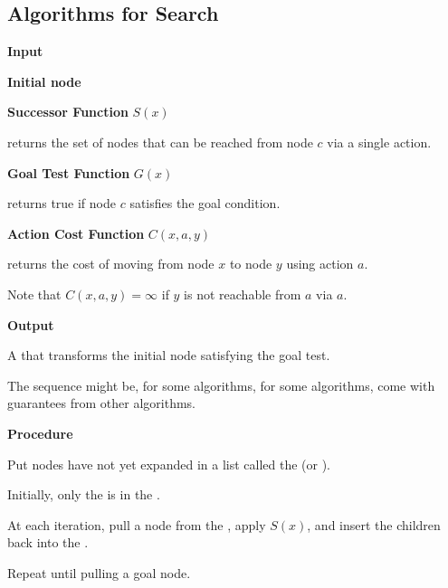 \subsection{Algorithms for Search}

\begin{listu}
    \item \textbf{Input}
    
    \begin{listu}
        \item \textbf{Initial node}

        \item \textbf{Successor Function} $S(x)$
        
        returns the set of nodes that can be reached from node $c$ via a single action. 

        \item \textbf{Goal Test Function} $G(x)$
        
        returns true if node $c$ satisfies the goal condition. 

        \item \textbf{Action Cost Function} $C(x, a, y)$
        
        returns the cost of moving from node $x$ to node $y$ using action $a$.

        Note that $C(x, a, y) = \infty$ if $y$ is not reachable from $a$ via $a$. 
    \end{listu}

    \item \textbf{Output}
    
    \begin{listu}
        \item A  that transforms the initial node satisfying the goal test. 
        \item The sequence might be,  for some algorithms,  for some algorithms, come with  guarantees from other algorithms.
    \end{listu}

    \item \textbf{Procedure}
    
    \begin{listu}
        \item Put nodes have not yet expanded in a list called the \term{\Frontier} (or ).
        \item Initially, only the  is in the \Frontier.
        \item At each iteration, pull a node from the \Frontier, apply $S(x)$, and insert the children back into the \Frontier.
        \item Repeat until pulling a goal node.
    \end{listu}
\end{listu}


